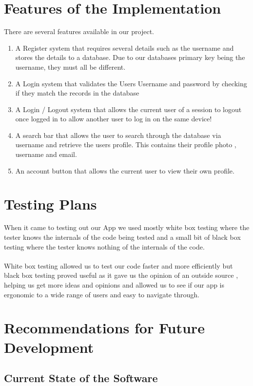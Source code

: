 \documentclass{article}
\begin{document}
\section{Features of the Implementation}

There are several features available in our project.
\begin{enumerate}
    \item A Register system that requires several details such as the username and stores the details to a database.
    Due to our databases primary key being the username, they must all be different.
    \item A Login system that validates the Users Username and password by checking if they match the records in the database
    \item A Login / Logout system that allows the current user of a session to logout once logged in to allow another user to log in on the same device!
    \item A search bar that allows the user to search through the database  via username and retrieve the users profile.
    This contains their profile photo , username and email.
    \item An account button that allows the current user to view their own profile.

\end{enumerate}


\section{Testing Plans}

When it came to testing out our App we used mostly white box testing where the tester knows the internals of the code being tested and a small bit of black box testing where the tester knows nothing of the internals of the code.
\\
\\
White box testing allowed us to test our code faster and more efficiently but black box testing proved useful as it gave us the opinion of an outside source  , helping us get more ideas and opinions and allowed us to see if our app is ergonomic to a wide range of users and easy to navigate through.

\section{Recommendations for Future Development}

\subsection{Current State of the Software}
\end{document}
